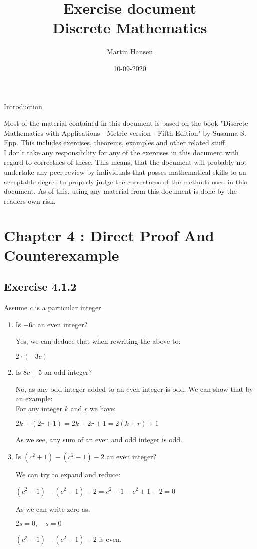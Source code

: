 \documentclass{article}
\author{Martin Hansen}
\date{10-09-2020}
\title{Exercise document \\ \small Discrete Mathematics}
\newcommand{\cent}[1]{\begin{center}#1\end{center}}
\newcommand{\Chapter}[2]{\section*{Chapter #1 : #2}}
\newcommand{\Exercise}[1]{\subsection*{Exercise #1}}
\begin{document}
	\maketitle
	
	\pagebreak
	
	\begin{center}
		\Large Introduction
	\end{center}
	
	Most of the material contained in this document is based on the book "Discrete Mathematics with Applications - Metric version - Fifth Edition" by Susanna S. Epp. This includes exercises, theorems, examples and other related stuff.\\
	
	I don't take any responsibility for any of the exercises in this document with regard to correctnes of these. This means, that the document will probably not undertake any peer review by individuals that posses mathematical skills to an acceptable degree to properly judge the correctness of the methods used in this document. As of this, using any material from this document is done by the readers own risk.
	
	\pagebreak
	
	\Chapter{4}{Direct Proof And Counterexample}
	\Exercise{4.1.2}
	Assume $c$ is a particular integer.
	\begin{enumerate}[label=\textbf{\alph*.}]
		\item Is $-6c$ an even integer?
		
		Yes, we can deduce that when rewriting the above to:
		
		$2\cdot (-3c) $
		
		\item Is $8c+5$ an odd integer?
		
		No, as any odd integer added to an even integer is odd. We can show that by an example:\\
		
		For any integer $k$ and $r$ we have:
		\cent{$2k + (2r+1) = 2k + 2r + 1 = 2(k+r) + 1$}
		
		As we see, any sum of an even and odd integer is odd.
		
		\item Is $(c^2 + 1) - (c^2 - 1) - 2$ an even integer?
		
		We can try to expand and reduce:
		
		\cent{$(c^2 + 1) - (c^2 - 1) - 2 = c^2 + 1 - c^2 + 1 - 2 = 0$}
		
		As we can write zero as:
		
		\cent{$2s = 0, \quad s = 0$}
		
		$(c^2 + 1) - (c^2 - 1) - 2$ is even.
	\end{enumerate}
	
\end{document}
